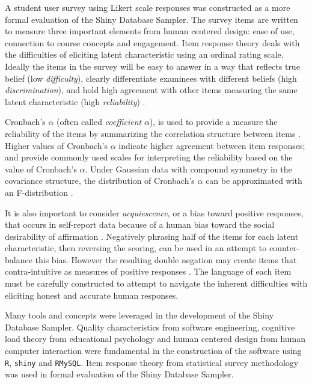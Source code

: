 \documentclass[11pt]{isuthesis}\usepackage[]{graphicx}\usepackage[]{color}
\begin{document}
A student user survey using Likert scale responses was constructed as a more formal evaluation of the Shiny Database Sampler. The survey items are written to measure three important elements from human centered design: ease of use, connection to course concepts and engagement. Item response theory deals with the difficulties of eliciting latent characteristic using an ordinal rating scale. Ideally the items in the survey will be easy to answer in a way that reflects true belief (low \textit{difficulty}), clearly differentiate examinees with different beliefs (high \textit{discrimination}), and hold high agreement with other items measuring the same latent characteristic (high \textit{reliability}) \citep{demars2010item}.

Cronbach's $\alpha$ (often called \textit{coefficient} $\alpha$), is used to provide a measure the reliability of the items by summarizing the correlation structure between items \citep{cronbach:51}. Higher values of Cronbach's $\alpha$ indicate higher agreement between item responses; \citet{GeorgeMallery2003} and \citet{Nunnally1978} provide commonly used scales for interpreting the reliability based on the value of Cronbach's $\alpha$.  Under Gaussian data with compound symmetry in the covariance structure, the distribution of Cronbach's $\alpha$ can be approximated with an F-distribution \citep{KistnerMuller2004}. 

It is also important to consider \textit{acquiescence}, or a bias toward positive responses, that occurs in self-report data because of a human bias toward the social desirability of affirmation \citep{Furnham1986}. Negatively phrasing half of the items for each latent characteristic, then reversing the scoring, can be used in an attempt to counter-balance this bias. However the resulting double negation may create items that contra-intuitive as measures of positive responses \citep{Friborg2006}. The language of each item must be carefully constructed to attempt to navigate the inherent difficulties with eliciting honest and accurate human responses.

Many tools and concepts were leveraged in the development of the Shiny Database Sampler. Quality characteristics from software engineering, cognitive load theory from educational psychology and human centered design from human computer interaction were fundamental in the construction of the software using \texttt{R}, \texttt{shiny} and \texttt{RMySQL}. Item response theory from statistical survey methodology was used in formal evaluation of the Shiny Database Sampler. 
\end{document}
